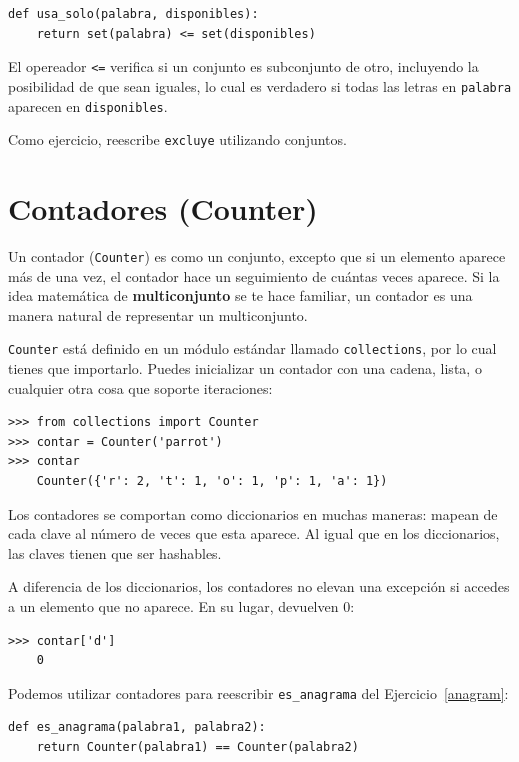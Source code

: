 \documentclass[10pt]{book}
\begin{document}
\begin{verbatim}
def usa_solo(palabra, disponibles):
    return set(palabra) <= set(disponibles)
\end{verbatim}
%
El opereador \verb"<=" verifica si un conjunto es subconjunto de otro,
incluyendo la posibilidad de que sean iguales, lo cual es verdadero si todas
las letras en {\tt palabra} aparecen en {\tt disponibles}.

Como ejercicio, reescribe \verb"excluye" utilizando conjuntos.


\section{Contadores (Counter)}

Un contador ({\tt Counter}) es como un conjunto, excepto que si un elemento aparece más
de una vez, el contador hace un seguimiento de cuántas veces aparece.
Si la idea matemática de {\bf multiconjunto} se te hace familiar,
un contador es una manera natural de representar un multiconjunto.

{\tt Counter} está definido en un módulo estándar llamado {\tt collections},
por lo cual tienes que importarlo.  Puedes inicializar un contador con una cadena,
lista, o cualquier otra cosa que soporte iteraciones:

\begin{verbatim}
>>> from collections import Counter
>>> contar = Counter('parrot')
>>> contar
    Counter({'r': 2, 't': 1, 'o': 1, 'p': 1, 'a': 1})
\end{verbatim}

Los contadores se comportan como diccionarios en muchas maneras: mapean de cada
clave al número de veces que esta aparece.  Al igual que en los diccionarios,
las claves tienen que ser hashables.

A diferencia de los diccionarios, los contadores no elevan una excepción si accedes a
un elemento que no aparece.  En su lugar, devuelven 0:

\begin{verbatim}
>>> contar['d']
    0
\end{verbatim}

Podemos utilizar contadores para reescribir \verb"es_anagrama" del
Ejercicio~\ref{anagram}:

\begin{verbatim}
def es_anagrama(palabra1, palabra2):
    return Counter(palabra1) == Counter(palabra2)
\end{verbatim}
\end{document}
